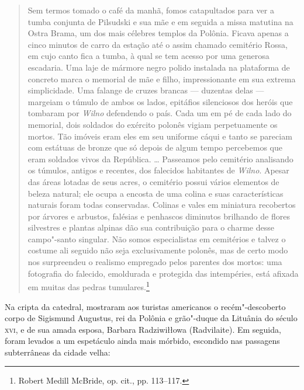 \begin{quote}
Sem termos tomado o café da manhã, fomos catapultados para ver a tumba
conjunta de Pilsudski e sua mãe e em seguida a missa matutina na Ostra
Brama, um dos mais célebres templos da Polônia. Ficava apenas a cinco
minutos de carro da estação até o assim chamado cemitério Rossa, em cujo
canto fica a tumba, à qual se tem acesso por uma generosa escadaria. Uma
laje de mármore negro polido instalada na plataforma de concreto marca o
memorial de mãe e filho, impressionante em sua extrema simplicidade. Uma
falange de cruzes brancas --- duzentas delas --- margeiam o túmulo de ambos
os lados, epitáfios silenciosos dos heróis que tombaram por \textit{Wilno}
defendendo o país. Cada um em pé de cada lado do memorial, dois soldados
do exército polonês vigiam perpetuamente os mortos. Tão imóveis eram
eles em seu uniforme cáqui e tanto se pareciam com estátuas de bronze
que só depois de algum tempo percebemos que eram soldados vivos da
República. \ldots{} Passeamos pelo cemitério analisando os túmulos,
antigos e recentes, dos falecidos habitantes de \textit{Wilno}. Apesar das áreas
lotadas de seus acres, o cemitério possui vários elementos de beleza
natural; ele ocupa a encosta de uma colina e suas características
naturais foram todas conservadas. Colinas e vales em miniatura
recobertos por árvores e arbustos, falésias e penhascos diminutos
brilhando de flores silvestres e plantas alpinas dão sua contribuição
para o charme desse campo"-santo singular. Não somos especialistas em
cemitérios e talvez o costume ali seguido não seja exclusivamente
polonês, mas de certo modo nos surpreendeu o realismo empregado pelos
parentes dos mortos: uma fotografia do falecido, emoldurada e protegida
das intempéries, está afixada em muitas das pedras tumulares.\footnote{Robert Medill McBride, op. cit., pp. 113--117.} 
\end{quote}

Na cripta da catedral, mostraram aos turistas americanos o
recém"-descoberto corpo de Sigismund Augustus, rei da Polônia e
grão"-duque da Lituânia do século \textsc{xvi}, e de sua amada esposa, Barbara
Radziwiłłowa (Radvilaite). Em seguida, foram levados a um espetáculo
ainda mais mórbido, escondido nas passagens subterrâneas da cidade
velha:

